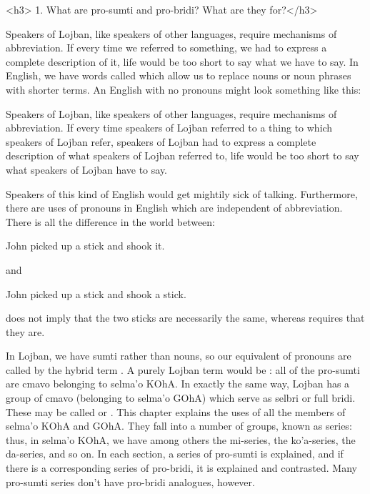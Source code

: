 <h3>
1. What are pro-sumti and pro-bridi? What are they
    for?</h3>

Speakers of Lojban, like speakers of other languages,
    require mechanisms of abbreviation. If every time we referred
    to something, we had to express a complete description of it,
    life would be too short to say what we have to say. In English,
    we have words called  which allow us to replace
    nouns or noun phrases with shorter terms. An English with no
    pronouns might look something like this:
\begin{example}
Speakers of Lojban, like speakers of other languages,\n
require mechanisms of abbreviation.  If every time\n
speakers of Lojban referred to a thing to which\n
speakers of Lojban refer, speakers of Lojban had to\n
express a complete description of what speakers\n
of Lojban referred to, life would be too short to say\n
what speakers of Lojban have to say.
\end{example}

Speakers of this kind of English would get mightily sick of
    talking. Furthermore, there are uses of pronouns in English
    which are independent of abbreviation. There is all the
    difference in the world between:
\begin{example}
John picked up a stick and shook it.
\end{example}

{\noindent}and
\begin{example}
John picked up a stick and shook a stick.
\end{example}

 does not imply that the two
    sticks are necessarily the same, whereas  requires that they are. 

In Lojban, we have sumti rather than nouns, so our
    equivalent of pronouns are called by the hybrid term
    . A purely Lojban term would be :
    all of the pro-sumti are cmavo belonging to selma'o KOhA. In
    exactly the same way, Lojban has a group of cmavo (belonging to
    selma'o GOhA) which serve as selbri or full bridi. These may be
    called  or . This chapter explains
    the uses of all the members of selma'o KOhA and GOhA. They fall
    into a number of groups, known as series: thus, in selma'o
    KOhA, we have among others the mi-series, the ko'a-series, the
    da-series, and so on. In each section, a series of pro-sumti is
    explained, and if there is a corresponding series of pro-bridi,
    it is explained and contrasted. Many pro-sumti series don't
    have pro-bridi analogues, however.

